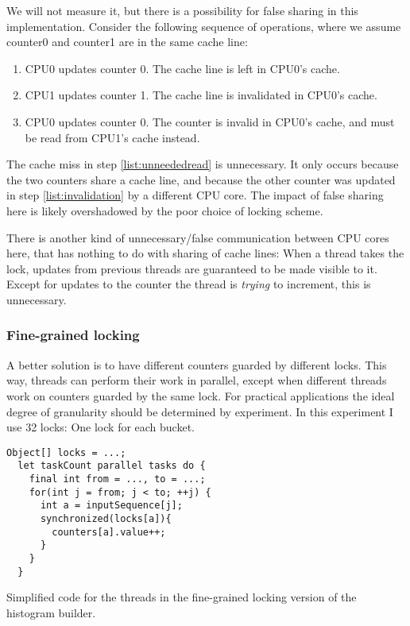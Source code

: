 We will not measure it, but there is a possibility for false sharing in this
implementation. Consider the following sequence of operations, where we assume
counter0 and counter1 are in the same cache line:

\begin{enumerate}
	\item CPU0 updates counter 0. The cache line is left in CPU0's cache.
	\item \label{list:invalidation} CPU1 updates counter 1. The cache line is invalidated in CPU0's
		cache.
	\item \label{list:unneededread} CPU0 updates counter 0. The counter is
		invalid in CPU0's cache, and
		must be read from CPU1's cache instead.
\end{enumerate}

The cache miss in step \ref{list:unneededread} is unnecessary. It only occurs
because the two counters share a cache line, and because the other counter was
updated in step \ref{list:invalidation} by a different CPU core. The impact of
false sharing here is likely overshadowed by the poor choice of locking scheme.

There is another kind of unnecessary/false communication between CPU cores here,
that has nothing to do with sharing of cache lines: When a thread takes the
lock, updates from previous threads are guaranteed to be made visible to it.
Except for updates to the counter the thread is \textit{trying} to increment,
this is unnecessary.

\subsubsection{Fine-grained locking}
\label{sec:fine-grained-histo}
A better solution is to have different counters guarded by different locks. This
way, threads can perform their work in parallel, except when different
threads work on counters guarded by the same lock. For practical applications
the ideal degree of granularity should be determined by experiment. In this
experiment I use 32 locks: One lock for each bucket.

\begin{code}
\begin{Verbatim}[frame=single]
  Object[] locks = ...;
  let taskCount parallel tasks do {
    final int from = ..., to = ...;
    for(int j = from; j < to; ++j) {
      int a = inputSequence[j];
      synchronized(locks[a]){
        counters[a].value++;
      }
    }
  }
\end{Verbatim}
	\caption{Simplified code for the threads in the fine-grained locking
	version of the histogram builder.}
\end{code}

